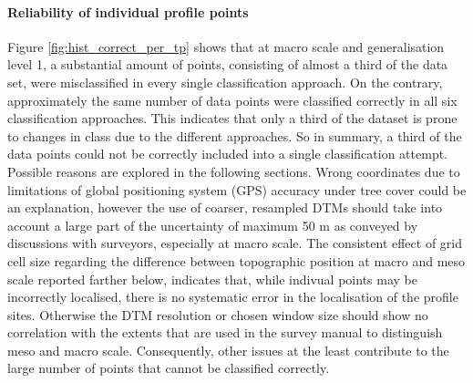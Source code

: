 \documentclass[final,1p,times,twocolumn,authoryear]{elsarticle}
\begin{document}
\paragraph{Reliability of individual profile points} 
Figure \ref{fig:hist_correct_per_tp} shows that at macro scale and generalisation level 1, a substantial amount of points, consisting of almost a third of the data set, were misclassified in every single classification approach. On the contrary, approximately the same number of data points were classified correctly in all six classification approaches. This indicates that only a third of the dataset is prone to changes in class due to the different approaches. So in summary, a third of the data points could not be correctly included into a single classification attempt. Possible reasons are explored in the following sections. Wrong coordinates due to limitations of global positioning system (GPS) accuracy under tree cover could be an explanation, however the use of coarser, resampled DTMs should take into account a large part of the uncertainty of maximum 50 m as conveyed by discussions with surveyors, especially at macro scale. The consistent effect of grid cell size regarding the difference between topographic position at macro and meso scale reported farther below, indicates that, while indivual points may be incorrectly localised, there is no systematic error in the localisation of the profile sites. Otherwise the DTM resolution or chosen window size should show no correlation with the extents that are used in the survey manual to distinguish meso and macro scale. Consequently, other issues at the least contribute to the large number of points that cannot be classified correctly. 
\end{document}
